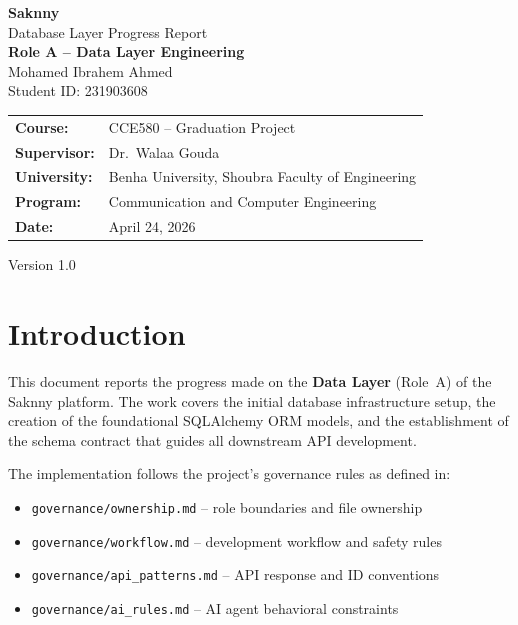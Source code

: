 \documentclass[12pt,a4paper]{article}
\begin{document}
\begin{titlepage}
    \centering
    \vspace*{3cm}

    {\Huge\bfseries\textcolor{saknnyprimary}{Saknny}}\\[0.5cm]
    {\Large\textcolor{saknnyaccent}{Database Layer Progress Report}}\\[1.5cm]

    {\large\textbf{Role A -- Data Layer Engineering}}\\[0.5cm]
    {\large Mohamed Ibrahem Ahmed}\\[0.3cm]
    {\large Student ID: 231903608}\\[2cm]

    \begin{tabular}{ll}
        \textbf{Course:}     & CCE580 -- Graduation Project \\
        \textbf{Supervisor:} & Dr.\ Walaa Gouda \\
        \textbf{University:} & Benha University, Shoubra Faculty of Engineering \\
        \textbf{Program:}    & Communication and Computer Engineering \\
        \textbf{Date:}       & April 24, 2026 \\
    \end{tabular}

    \vfill
    {\small Version 1.0}
\end{titlepage}

\tableofcontents
\newpage

\section{Introduction}

This document reports the progress made on the \textbf{Data Layer} (Role~A) of the Saknny platform. The work covers the initial database infrastructure setup, the creation of the foundational SQLAlchemy ORM models, and the establishment of the schema contract that guides all downstream API development.

The implementation follows the project's governance rules as defined in:
\begin{itemize}[noitemsep]
    \item \texttt{governance/ownership.md} -- role boundaries and file ownership
    \item \texttt{governance/workflow.md} -- development workflow and safety rules
    \item \texttt{governance/api\_patterns.md} -- API response and ID conventions
    \item \texttt{governance/ai\_rules.md} -- AI agent behavioral constraints
\end{itemize}
\end{document}
